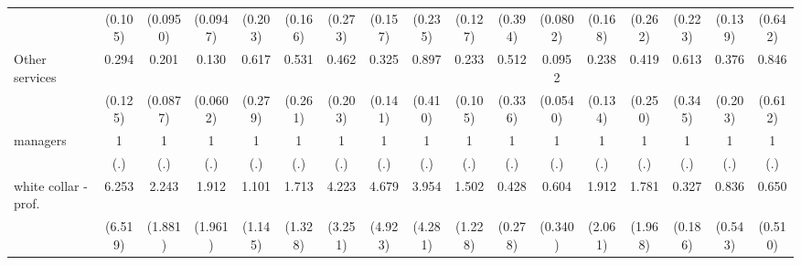 {\begin{tabular}{l*{16}{c}}
                    &     (0.105)         &    (0.0950)         &    (0.0947)         &     (0.203)         &     (0.166)         &     (0.273)         &     (0.157)         &     (0.235)         &     (0.127)         &     (0.394)         &    (0.0802)         &     (0.168)         &     (0.262)         &     (0.223)         &     (0.139)         &     (0.642)         \\
[1em]
Other services      &       0.294\sym{**} &       0.201\sym{***}&       0.130\sym{***}&       0.617         &       0.531         &       0.462         &       0.325\sym{**} &       0.897         &       0.233\sym{**} &       0.512         &      0.0952\sym{***}&       0.238\sym{*}  &       0.419         &       0.613         &       0.376         &       0.846         \\
                    &     (0.125)         &    (0.0877)         &    (0.0602)         &     (0.279)         &     (0.261)         &     (0.203)         &     (0.141)         &     (0.410)         &     (0.105)         &     (0.336)         &    (0.0540)         &     (0.134)         &     (0.250)         &     (0.345)         &     (0.203)         &     (0.612)         \\
[1em]
managers            &           1         &           1         &           1         &           1         &           1         &           1         &           1         &           1         &           1         &           1         &           1         &           1         &           1         &           1         &           1         &           1         \\
                    &         (.)         &         (.)         &         (.)         &         (.)         &         (.)         &         (.)         &         (.)         &         (.)         &         (.)         &         (.)         &         (.)         &         (.)         &         (.)         &         (.)         &         (.)         &         (.)         \\
[1em]
white collar - prof.&       6.253         &       2.243         &       1.912         &       1.101         &       1.713         &       4.223         &       4.679         &       3.954         &       1.502         &       0.428         &       0.604         &       1.912         &       1.781         &       0.327\sym{*}  &       0.836         &       0.650         \\
                    &     (6.519)         &     (1.881)         &     (1.961)         &     (1.145)         &     (1.328)         &     (3.251)         &     (4.923)         &     (4.281)         &     (1.228)         &     (0.278)         &     (0.340)         &     (2.061)         &     (1.968)         &     (0.186)         &     (0.543)         &     (0.510)         \\

\end{tabular}}
